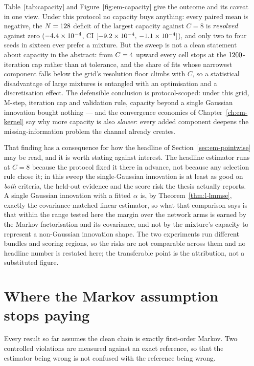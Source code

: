 Table~\ref{tab:capacity} and Figure~\ref{fig:em-capacity} give the outcome
and its caveat in one view. Under this protocol no capacity buys anything:
every paired mean is negative, the $N = 128$ deficit of the
largest capacity against $C = 8$ is $resolved$ against zero
($-4.4 \times 10^{-4}$, CI $[-9.2 \times 10^{-4},\, -1.1 \times 10^{-4}]$), and only two to four seeds in
sixteen ever prefer a mixture. But the sweep is not a clean statement about
capacity in the abstract: from $C = 4$ upward every cell stops at the
$1200$-iteration cap rather than at tolerance, and the share of fits
whose narrowest component falls below the grid's resolution floor climbs with
$C$, so a statistical disadvantage of large mixtures is entangled with an
optimisation and a discretisation effect. The defensible conclusion is
protocol-scoped: under this grid, M-step, iteration cap and validation rule,
capacity beyond a single Gaussian innovation bought nothing --- and the
convergence economics of Chapter~\ref{ch:em-kernel} say why more capacity is
also \emph{slower}: every added component deepens the missing-information
problem the channel already creates.

That finding has a consequence for how the headline of
Section~\ref{sec:em-pointwise} may be read, and it is worth stating against
interest. The headline estimator runs at $C = 8$ because the protocol fixed it
there in advance, not because any selection rule chose it; in this sweep the
single-Gaussian innovation is at least as good on \emph{both} criteria, the
held-out evidence and the score risk the thesis actually reports. A single
Gaussian innovation with a fitted $\alpha$ is, by
Theorem~\ref{thm:l-lmmse}, exactly the covariance-matched linear estimator, so
what that comparison says is that within the range tested here the margin over
the network arms is earned by the Markov factorisation and its covariance, and
not by the mixture's capacity to represent a non-Gaussian innovation shape.
The two experiments run different bundles and scoring regions, so the risks
are not comparable across them and no headline number is restated here; the
transferable point is the attribution, not a substituted figure.

\section{Where the Markov assumption stops paying}\label{sec:em-nonmarkov}

Every result so far assumes the clean chain is exactly first-order Markov. Two
controlled violations are measured against an exact reference, so that the
estimator being wrong is not confused with the reference being wrong.

